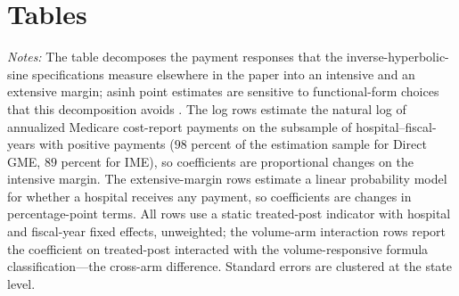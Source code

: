 
\renewcommand{\thefigure}{A.\arabic{figure}}
\setcounter{figure}{0}
\renewcommand{\thetable}{A.\arabic{table}}
\setcounter{table}{0}
\renewcommand{\theequation}{A.\arabic{equation}}
\setcounter{equation}{0}
\renewcommand{\thefootnote}{A.\arabic{footnote}}
\setcounter{footnote}{0}

\section{Tables}\label{appendix:tabs}

\begin{table}[H]
\centering
\singlespacing
\begin{threeparttable}
\caption{Payment Responses Decomposed: Intensive and Extensive Margins}
\label{atab:logpositive}

\begin{tablenotes}\footnotesize
\item \textit{Notes:} The table decomposes the payment responses that the inverse-hyperbolic-sine specifications measure elsewhere in the paper into an intensive and an extensive margin; asinh point estimates are sensitive to functional-form choices that this decomposition avoids \autocite{chen2024logs}. The log rows estimate the natural log of annualized Medicare cost-report payments on the subsample of hospital--fiscal-years with positive payments ($98$ percent of the estimation sample for Direct GME, $89$ percent for IME), so coefficients are proportional changes on the intensive margin. The extensive-margin rows estimate a linear probability model for whether a hospital receives any payment, so coefficients are changes in percentage-point terms. All rows use a static treated-post indicator with hospital and fiscal-year fixed effects, unweighted; the volume-arm interaction rows report the coefficient on treated-post interacted with the volume-responsive formula classification---the cross-arm difference. Standard errors are clustered at the state level.
\end{tablenotes}
\end{threeparttable}
\end{table}

